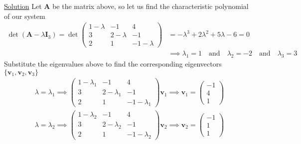 \documentclass[12pt]{article}
\begin{document}
\uline{Solution}
Let \(\mathbf{A}\) be the matrix above, so let us find the characteristic
polynomial of our system
\begin{align*}
        \det (\mathbf{A} - \lambda \mathbf{I}_3) =
        \det \begin{pmatrix}
                1 - \lambda & -1          & 4            \\
                3           & 2 - \lambda & -1           \\
                2           & 1           & -1 - \lambda
        \end{pmatrix} & =
        - \lambda^3 + 2 \lambda^2 + 5\lambda -6 = 0                                                                                        \\
                                       & \implies \lambda_1 = 1 \quad \text{and} \quad \lambda_2 = -2 \quad \text{and} \quad \lambda_3 = 3
\end{align*}
Substitute the eigenvalues above to find the corresponding eigenvectors
\(\{\mathbf{v}_1, \mathbf{v}_2, \mathbf{v}_3\}\)
\begin{align*}
        \lambda = \lambda_1
        \implies
        \begin{pmatrix}
                1 - \lambda_1 & -1            & 4              \\
                3             & 2 - \lambda_1 & -1             \\
                2             & 1             & -1 - \lambda_1
        \end{pmatrix} \mathbf{v}_1
        \implies
        \mathbf{v}_1 =
        \begin{pmatrix}
                -1 \\ 4 \\ 1
        \end{pmatrix}
\end{align*}
\begin{align*}
        \lambda = \lambda_2
        \implies
        \begin{pmatrix}
                1 - \lambda_2 & -1            & 4              \\
                3             & 2 - \lambda_2 & -1             \\
                2             & 1             & -1 - \lambda_2
        \end{pmatrix} \mathbf{v}_2
        \implies
        \mathbf{v}_2 =
        \begin{pmatrix}
                -1 \\ 1 \\ 1
        \end{pmatrix}
\end{align*}
\end{document}
